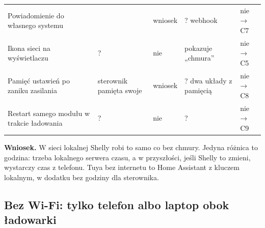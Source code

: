 \documentclass[11pt,a4paper]{article}
\begin{document}
\begin{longtable}{>{\raggedright\arraybackslash}p{3.95cm}>{\raggedright\arraybackslash}p{2.28cm}>{\raggedright\arraybackslash}p{2.35cm}>{\raggedright\arraybackslash}p{2.65cm}>{\raggedright\arraybackslash}p{3.18cm}}
Powiadomienie do własnego systemu & \leavevmode{\symbolfont\color{apred}\textbf{✘}} & wniosek & ? webhook & nie {\symbolfont→} C7 \\
Ikona sieci na wyświetlaczu & ? & nie & \leavevmode{\symbolfont\color{apamber}\textbf{◐}} pokazuje „chmura” & nie {\symbolfont→} C5 \\
Pamięć ustawień po zaniku zasilania & \leavevmode{\symbolfont\color{apamber}\textbf{◐}} sterownik pamięta swoje & wniosek & ? dwa układy z pamięcią & nie {\symbolfont→} C8 \\
Restart samego modułu w trakcie ładowania & ? & nie & ? & nie {\symbolfont→} C9 \\
\end{longtable}

\textbf{Wniosek.} W sieci lokalnej Shelly robi to samo co bez chmury. Jedyna różnica to godzina: trzeba lokalnego serwera czasu, a w przyszłości, jeśli Shelly to zmieni, wystarczy czas z telefonu. Tuya bez internetu to Home Assistant z kluczem lokalnym, w dodatku bez godziny dla sterownika.


\subsection{Bez Wi-Fi: tylko telefon albo laptop obok ładowarki}
\end{document}
